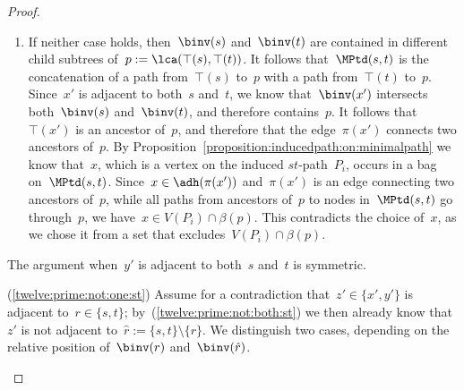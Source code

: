 \begin{proof}
\begin{claimproof}
\begin{enumerate}
	\item If neither case holds, then~$\binv(s)$ and~$\binv(t)$ are contained in different child subtrees of~$p := \lca(\top(s), \top(t))$. It follows that~$\MPtd(s,t)$ is the concatenation of a path from~$\top(s)$ to~$p$ with a path from~$\top(t)$ to~$p$. Since~$x'$ is adjacent to both~$s$ and~$t$, we know that~$\binv(x')$ intersects both~$\binv(s)$ and~$\binv(t)$, and therefore contains~$p$. It follows that~$\top(x')$ is an ancestor of~$p$, and therefore that the edge~$\pi(x')$ connects two ancestors of~$p$. By Proposition~\ref{proposition:inducedpath:on:minimalpath} we know that~$x$, which is a vertex on the induced $st$-path~$P_i$, occurs in a bag on~$\MPtd(s,t)$. Since~$x \in \adh(\pi(x'))$ and~$\pi(x')$ is an edge connecting two ancestors of~$p$, while all paths from ancestors of~$p$ to nodes in~$\MPtd(s,t)$ go through~$p$, we have~$x \in V(P_i) \cap \beta(p)$. This contradicts the choice of~$x$, as we chose it from a set that excludes~$V(P_i) \cap \beta(p)$.
\end{enumerate}

The argument when~$y'$ is adjacent to both~$s$ and~$t$ is symmetric.

(\ref{twelve:prime:not:one:st}) Assume for a contradiction that~$z' \in \{x',y'\}$ is adjacent to~$r \in \{s,t\}$; by~(\ref{twelve:prime:not:both:st}) we then already know that~$z'$ is not adjacent to~$\hat{r} := \{s,t\} \setminus \{r\}$. We distinguish two cases, depending on the relative position of~$\binv(r)$ and~$\binv(\hat{r})$.


\end{claimproof}
\end{proof}

